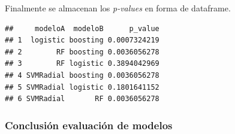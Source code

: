 \documentclass[]{article}
\newenvironment{Shaded}{\begin{snugshade}}{\end{snugshade}}
\newcommand{\DataTypeTok}[1]{\textcolor[rgb]{0.13,0.29,0.53}{#1}}
\newcommand{\KeywordTok}[1]{\textcolor[rgb]{0.13,0.29,0.53}{\textbf{#1}}}
\newcommand{\NormalTok}[1]{#1}
\newcommand{\OperatorTok}[1]{\textcolor[rgb]{0.81,0.36,0.00}{\textbf{#1}}}
\newcommand{\OtherTok}[1]{\textcolor[rgb]{0.56,0.35,0.01}{#1}}
\newcommand{\StringTok}[1]{\textcolor[rgb]{0.31,0.60,0.02}{#1}}
\begin{document}
\begin{Shaded}
\end{Shaded}

Finalmente se almacenan los \emph{p-values} en forma de dataframe.

\begin{Shaded}
\end{Shaded}

\begin{verbatim}
##     modeloA  modeloB      p_value
## 1  logistic boosting 0.0007324219
## 2        RF boosting 0.0036056278
## 3        RF logistic 0.3894042969
## 4 SVMRadial boosting 0.0036056278
## 5 SVMRadial logistic 0.1801641152
## 6 SVMRadial       RF 0.0036056278
\end{verbatim}

\hypertarget{conclusiuxf3n-evaluaciuxf3n-de-modelos}{%
\subsubsection{Conclusión evaluación de
modelos}\label{conclusiuxf3n-evaluaciuxf3n-de-modelos}}
\end{document}
